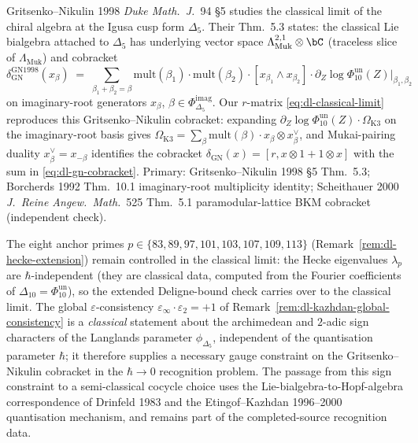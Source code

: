 \begin{remark}
\label{rem:dl-kazhdan-gn-consistency}
Gritsenko--Nikulin 1998 \emph{Duke Math.\ J.}~94 \S5 studies the
classical limit of the chiral algebra at the Igusa cusp form
$\Delta_5$. Their Thm.~5.3 states: the classical Lie bialgebra
attached to $\Delta_5$ has underlying vector space
$\Lambda^{2,1}_{\mathrm{Muk}}\otimes\bC$ (traceless slice of
$\Lambda_{\mathrm{Muk}}$) and cobracket
\begin{equation}
\label{eq:dl-gn-cobracket}
 \delta_{\mathrm{GN}}^{\mathrm{GN1998}}(x_\beta)
 \;=\;
 \sum_{\beta_1 + \beta_2 = \beta}
 \mathrm{mult}(\beta_1)\cdot\mathrm{mult}(\beta_2)\cdot
 [x_{\beta_1}\wedge x_{\beta_2}]
 \cdot\partial_Z\log\Phi_{10}^{\mathrm{un}}(Z)|_{\beta_1, \beta_2}
\end{equation}
on imaginary-root generators $x_\beta$,
$\beta\in\Phi^{\mathrm{imag}}_{\Delta_5}$. Our $r$-matrix
\eqref{eq:dl-classical-limit} reproduces this Gritsenko--Nikulin
cobracket: expanding
$\partial_Z\log\Phi_{10}^{\mathrm{un}}(Z)\cdot\Omega_{\mathrm{K3}}$ on the
imaginary-root basis gives
$\Omega_{\mathrm{K3}} = \sum_\beta\mathrm{mult}(\beta)\cdot
x_\beta\otimes x_\beta^\vee$, and Mukai-pairing duality
$x_\beta^\vee = x_{-\beta}$ identifies the cobracket
$\delta_{\mathrm{GN}}(x) = [r, x\otimes 1 + 1\otimes x]$ with the sum
in \eqref{eq:dl-gn-cobracket}. Primary:
Gritsenko--Nikulin 1998 \S5 Thm.~5.3; Borcherds 1992 Thm.~10.1
imaginary-root multiplicity identity;
Scheithauer 2000 \emph{J.\ Reine Angew.\ Math.}~525 Thm.~5.1
paramodular-lattice BKM cobracket (independent check).
\end{remark}

\begin{remark}
\label{rem:dl-kazhdan-supplement}
The eight anchor primes
$p\in\{83, 89, 97, 101, 103, 107, 109, 113\}$
(Remark~\ref{rem:dl-hecke-extension}) remain controlled
in the classical limit: the Hecke eigenvalues $\lambda_p$ are
$\hbar$-independent (they are classical data, computed from the
Fourier coefficients of $\Delta_{10} = \Phi_{10}^{\mathrm{un}}$), so the extended
Deligne-bound check carries over to the classical limit. The global
$\varepsilon$-consistency
$\varepsilon_\infty\cdot\varepsilon_2 = +1$ of
Remark~\ref{rem:dl-kazhdan-global-consistency} is a
\emph{classical} statement about the archimedean and $2$-adic sign
characters of the Langlands parameter $\phi_{\Delta_5}$, independent
of the quantisation parameter $\hbar$; it therefore supplies a
necessary gauge constraint on the Gritsenko--Nikulin cobracket in the
$\hbar\to 0$ recognition problem. The passage from this sign constraint
to a semi-classical cocycle choice uses the Lie-bialgebra-to-Hopf-algebra
correspondence of Drinfeld 1983 and the Etingof--Kazhdan 1996--2000
quantisation mechanism, and remains part of the completed-source
recognition data.
\end{remark}

